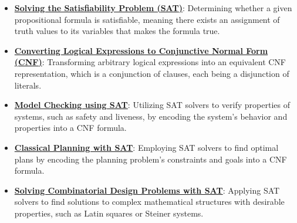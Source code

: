 \documentclass{article}%
\begin{document}
\begin{itemize}[leftmargin=*]%
\item \href{https://purdue.brightspace.com/d2l/common/assets/pdfjs-d2l-dist/1.0.14-legacy/web/viewer.html?file=\%2Fcontent\%2Fenforced\%2F1095467-wl.202510.CS.24300.001\%2F13L1-Logic.pdf\%3Fou\%3D1095467\&lang=en-us\&container=d2l-fileviewer-rendered-pdf\&fullscreen=d2l-fileviewer-rendered-pdf-dialog\&height=667#page=15}{\textbf{Solving the Satisfiability Problem (SAT)}}: Determining whether a given propositional formula is satisfiable, meaning there exists an assignment of truth values to its variables that makes the formula true.%
\item \href{https://purdue.brightspace.com/d2l/common/assets/pdfjs-d2l-dist/1.0.14-legacy/web/viewer.html?file=\%2Fcontent\%2Fenforced\%2F1095467-wl.202510.CS.24300.001\%2F13L1-Logic.pdf\%3Fou\%3D1095467\&lang=en-us\&container=d2l-fileviewer-rendered-pdf\&fullscreen=d2l-fileviewer-rendered-pdf-dialog\&height=667#page=16}{\textbf{Converting Logical Expressions to Conjunctive Normal Form (CNF)}}: Transforming arbitrary logical expressions into an equivalent CNF representation, which is a conjunction of clauses, each being a disjunction of literals.%
\item \href{https://purdue.brightspace.com/d2l/common/assets/pdfjs-d2l-dist/1.0.14-legacy/web/viewer.html?file=\%2Fcontent\%2Fenforced\%2F1095467-wl.202510.CS.24300.001\%2F13L1-Logic.pdf\%3Fou\%3D1095467\&lang=en-us\&container=d2l-fileviewer-rendered-pdf\&fullscreen=d2l-fileviewer-rendered-pdf-dialog\&height=667#page=20}{\textbf{Model Checking using SAT}}: Utilizing SAT solvers to verify properties of systems, such as safety and liveness, by encoding the system's behavior and properties into a CNF formula.%
\item \href{https://purdue.brightspace.com/d2l/common/assets/pdfjs-d2l-dist/1.0.14-legacy/web/viewer.html?file=\%2Fcontent\%2Fenforced\%2F1095467-wl.202510.CS.24300.001\%2F13L1-Logic.pdf\%3Fou\%3D1095467\&lang=en-us\&container=d2l-fileviewer-rendered-pdf\&fullscreen=d2l-fileviewer-rendered-pdf-dialog\&height=667#page=21}{\textbf{Classical Planning with SAT}}: Employing SAT solvers to find optimal plans by encoding the planning problem's constraints and goals into a CNF formula.%
\item \href{https://purdue.brightspace.com/d2l/common/assets/pdfjs-d2l-dist/1.0.14-legacy/web/viewer.html?file=\%2Fcontent\%2Fenforced\%2F1095467-wl.202510.CS.24300.001\%2F13L1-Logic.pdf\%3Fou\%3D1095467\&lang=en-us\&container=d2l-fileviewer-rendered-pdf\&fullscreen=d2l-fileviewer-rendered-pdf-dialog\&height=667#page=22}{\textbf{Solving Combinatorial Design Problems with SAT}}: Applying SAT solvers to find solutions to complex mathematical structures with desirable properties, such as Latin squares or Steiner systems.%

\end{itemize}
\end{document}
